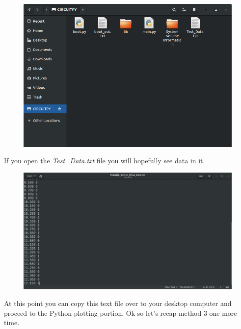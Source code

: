 \begin{figure}[H]
  \begin{center}
    \includegraphics[width=\textwidth]{Figures/method3_3.png}
  \end{center}
\end{figure}
If you open the {\it Test\_Data.txt} file you will hopefully see data in it.
\begin{figure}[H]
  \begin{center}
    \includegraphics[width=\textwidth]{Figures/Gedit_Data.png}
  \end{center}
\end{figure}
At this point you can copy this text file over to your desktop computer and proceed to the Python plotting portion.
Ok so let’s recap method 3 one more time.
